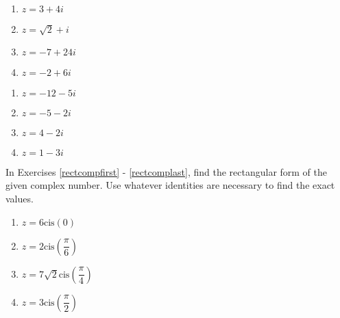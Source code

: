 \documentclass{ximera}
\begin{document}
\begin{multicols}{4} 

\begin{enumerate}

\setcounter{enumi}{\value{HW}}

\item $z = 3 + 4i$
\item $z = \sqrt{2} + i$
\item $z = -7 + 24i$
\item $z = -2+6i$

\setcounter{HW}{\value{enumi}}

\end{enumerate}

\end{multicols}

\begin{multicols}{4} 

\begin{enumerate}

\setcounter{enumi}{\value{HW}}

\item $z = -12-5i$
\item $z = -5-2i$
\item $z = 4-2i$
\item $z = 1-3i$ \label{polarcompbasiclast}

\setcounter{HW}{\value{enumi}}

\end{enumerate}

\end{multicols}

In Exercises \ref{rectcompfirst} - \ref{rectcomplast}, find the rectangular form of the given complex number.  Use whatever identities are necessary to find the exact values.

\begin{multicols}{4}

\begin{enumerate}

\setcounter{enumi}{\value{HW}}

\item $z = 6\text{cis}(0)$  \label{rectcompfirst}
\item $z = 2\text{cis}\left(\dfrac{\pi}{6}\right)$ 
\item $z = 7\sqrt{2}\text{cis}\left(\dfrac{\pi}{4}\right)$
\item $z = 3\text{cis}\left(\dfrac{\pi}{2}\right)$ 

\setcounter{HW}{\value{enumi}}

\end{enumerate}

\end{multicols}
\end{document}
